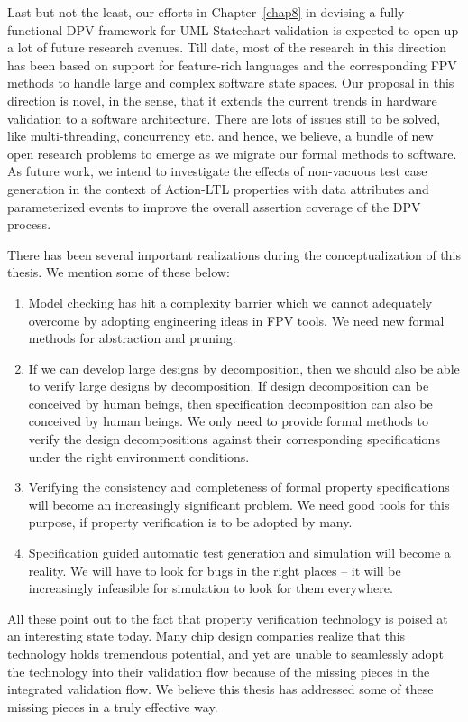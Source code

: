 \noindent
Last but not the least, our efforts in Chapter~\ref{chap8} in 
devising a fully-functional DPV framework for UML Statechart validation 
is expected to open up a lot of future research avenues. Till date, most 
of the research in this direction has been based on support for feature-rich 
languages and the corresponding FPV methods to handle large and complex 
software state spaces. Our proposal in this direction is novel, in the sense, 
that it extends the current trends in hardware validation to a software 
architecture. There are lots of issues still to be solved, like 
multi-threading, concurrency etc. and hence, we believe, a bundle of new open 
research problems to emerge as we migrate our formal methods to software. 
As future work, we intend to investigate the effects of non-vacuous test 
case generation in the context of Action-LTL properties with data 
attributes and parameterized events to improve the overall assertion 
coverage of the DPV process.

\noindent
There has been several important realizations during the conceptualization of
this thesis. We mention some of these below:
\begin{enumerate}

\item Model checking has hit a complexity barrier which we cannot adequately
    overcome by adopting engineering ideas in FPV tools. We need new formal 
	methods for abstraction and pruning.

\item If we can develop large designs by decomposition, then we should also
    be able to verify large designs by decomposition. If design
    decomposition can be conceived by human beings, then specification
    decomposition can also be conceived by human beings. We only need to
    provide formal methods to verify the design decompositions 
	against their corresponding specifications under 
	the right environment conditions.

\item Verifying the consistency and completeness of formal property
    specifications will become an increasingly significant problem. We
    need good tools for this purpose, if property verification 
    is to be adopted by many. 

\item Specification guided automatic test generation and simulation will
    become a reality. We will have to look for bugs in the right places
    -- it will be increasingly infeasible for simulation to look for
    them everywhere.

\end{enumerate}
\noindent
All these point out to the fact that property verification technology is 
poised at an interesting state today. Many chip design companies realize 
that this technology holds tremendous potential, and yet are unable to 
seamlessly adopt the technology into their validation flow because of the 
missing pieces in the integrated validation flow. We believe this thesis 
has addressed some of these missing pieces in a truly effective way.
